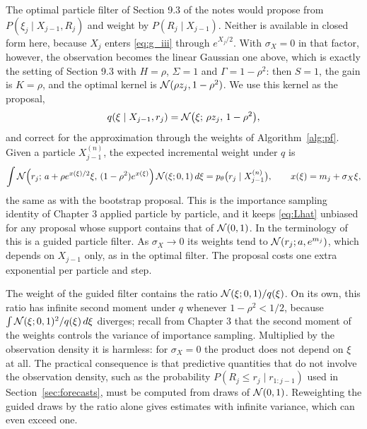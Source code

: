 The optimal particle filter of Section 9.3 of the notes would propose from $P(\xi_j \mid X_{j-1}, R_j)$ and weight by $P(R_j \mid X_{j-1})$. Neither is available in closed form here, because $X_j$ enters \eqref{eq:g_iii} through $e^{X_j/2}$. With $\sigma_X = 0$ in that factor, however, the observation becomes the linear Gaussian one above, which is exactly the setting of Section 9.3 with $H = \rho$, $\Sigma = 1$ and $\Gamma = 1 - \rho^2$: then $S = 1$, the gain is $K = \rho$, and the optimal kernel is $\mathcal{N}(\rho z_j, 1 - \rho^2)$. We use this kernel as the proposal,
\begin{equation}
        q(\xi \mid X_{j-1}, r_j) = \mathcal{N}\big(\xi;\, \rho z_j,\, 1 - \rho^2\big),
        \label{eq:guided}
\end{equation}
and correct for the approximation through the weights of Algorithm~\ref{alg:pf}. Given a particle $X_{j-1}^{(n)}$, the expected incremental weight under $q$ is
\[
        \int \mathcal{N}\Big(r_j;\, a + \rho e^{x(\xi)/2}\xi,\, (1-\rho^2)e^{x(\xi)}\Big)\,\mathcal{N}(\xi; 0, 1)\,d\xi = p_\theta\big(r_j \mid X_{j-1}^{(n)}\big),
        \qquad x(\xi) = m_j + \sigma_X\xi,
\]
the same as with the bootstrap proposal. This is the importance sampling identity of Chapter 3 applied particle by particle, and it keeps \eqref{eq:Lhat} unbiased for any proposal whose support contains that of $\mathcal{N}(0,1)$. In the terminology of \cite[Chapter 10]{chopinPapaspiliopoulos2020} this is a guided particle filter. As $\sigma_X \to 0$ its weights tend to $\mathcal{N}(r_j; a, e^{m_j})$, which depends on $X_{j-1}$ only, as in the optimal filter. The proposal costs one extra exponential per particle and step.

\begin{remark}
The weight of the guided filter contains the ratio $\mathcal{N}(\xi; 0, 1)/q(\xi)$. On its own, this ratio has infinite second moment under $q$ whenever $1 - \rho^2 < 1/2$, because $\int \mathcal{N}(\xi; 0, 1)^2/q(\xi)\,d\xi$ diverges; recall from Chapter 3 that the second moment of the weights controls the variance of importance sampling. Multiplied by the observation density it is harmless: for $\sigma_X = 0$ the product does not depend on $\xi$ at all. The practical consequence is that predictive quantities that do not involve the observation density, such as the probability $P(R_j \le r_j \mid r_{1:j-1})$ used in Section~\ref{sec:forecasts}, must be computed from draws of $\mathcal{N}(0, 1)$. Reweighting the guided draws by the ratio alone gives estimates with infinite variance, which can even exceed one.
\end{remark}

